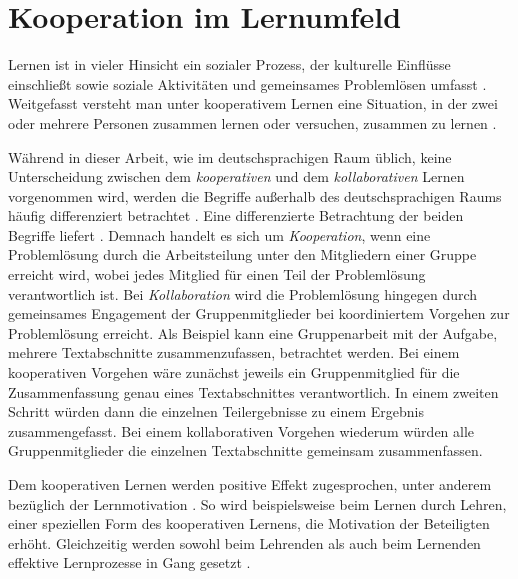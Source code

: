 \section{Kooperation im Lernumfeld}
\label{sec:kooperativeslernen}
\glqq Lernen ist in vieler Hinsicht ein sozialer Prozess, der kulturelle Einflüsse einschließt sowie soziale Aktivitäten und gemeinsames Problemlösen umfasst\grqq{} \citep{reinmann1995kooperation}. %
Weitgefasst versteht man unter kooperativem Lernen eine Situation, in der zwei oder mehrere Personen zusammen lernen oder versuchen, zusammen zu lernen \citep{dillenbourg1999collaborative}.

Während in dieser Arbeit, wie im deutschsprachigen Raum üblich, keine Unterscheidung zwischen dem \textit{kooperativen} und dem \textit{kollaborativen} Lernen vorgenommen wird, werden die Begriffe außerhalb des deutschsprachigen Raums häufig differenziert betrachtet \citep{reinmann2002analyse}. Eine differenzierte Betrachtung der beiden Begriffe liefert \cite{dillenbourg1995evolution}. Demnach handelt es sich um \textit{Kooperation}, wenn eine Problemlösung durch die Arbeitsteilung unter den Mitgliedern einer Gruppe erreicht wird, wobei jedes Mitglied für einen Teil der Problemlösung verantwortlich ist.
Bei \textit{Kollaboration} wird die Problemlösung hingegen durch gemeinsames Engagement der Gruppenmitglieder bei koordiniertem Vorgehen zur Problemlösung erreicht.
Als Beispiel kann eine Gruppenarbeit mit der Aufgabe, mehrere Textabschnitte zusammenzufassen, betrachtet werden.
Bei einem kooperativen Vorgehen wäre zunächst jeweils ein Gruppenmitglied für die Zusammenfassung genau eines Textabschnittes verantwortlich. In einem zweiten Schritt würden dann die einzelnen Teilergebnisse zu einem Ergebnis zusammengefasst. Bei einem kollaborativen Vorgehen wiederum würden alle Gruppenmitglieder die einzelnen Textabschnitte gemeinsam zusammenfassen.

Dem kooperativen Lernen werden positive Effekt zugesprochen, unter anderem bezüglich der Lernmotivation \citep{reinmann1995kooperation,dillenbourg1999collaborative}. So wird beispielsweise beim Lernen durch Lehren, einer speziellen Form des kooperativen Lernens, die Motivation der Beteiligten erhöht. Gleichzeitig werden sowohl beim Lehrenden als auch beim Lernenden effektive Lernprozesse in Gang gesetzt \citep{reinmann1995kooperation}.

